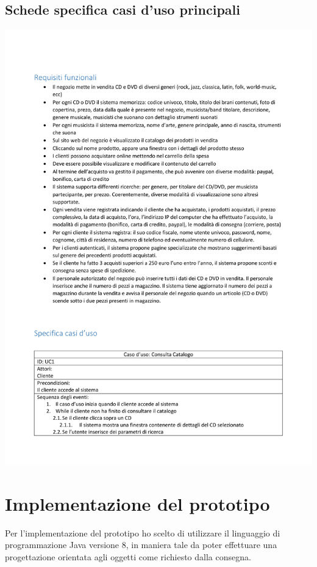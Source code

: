 \documentclass{article}
\begin{document}
\subsection{Schede specifica casi d'uso principali} 
\includegraphics{casi-uso.pdf}

\section{Implementazione del prototipo}
Per l'implementazione del prototipo ho scelto di utilizzare il linguaggio di programmazione Java versione 8, in maniera tale da poter
effettuare una progettazione orientata agli oggetti come richiesto dalla consegna. 
\end{document}
